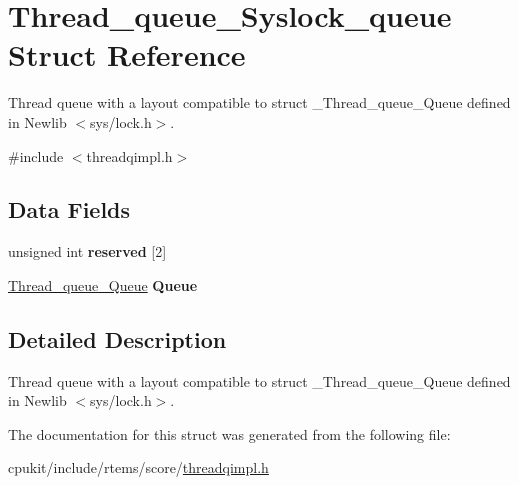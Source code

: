 \hypertarget{structThread__queue__Syslock__queue}{}\section{Thread\+\_\+queue\+\_\+\+Syslock\+\_\+queue Struct Reference}
\label{structThread__queue__Syslock__queue}


Thread queue with a layout compatible to struct \+\_\+\+Thread\+\_\+queue\+\_\+\+Queue defined in Newlib $<$sys/lock.\+h$>$.  




{\ttfamily \#include $<$threadqimpl.\+h$>$}

\subsection*{Data Fields}
\begin{DoxyCompactItemize}
\item 
\mbox{\label{structThread__queue__Syslock__queue_a6fdd31d3db9d339b54df45c196cbbd1a}} 
unsigned int {\bfseries reserved} \mbox{[}2\mbox{]}
\item 
\mbox{\label{structThread__queue__Syslock__queue_a625c96f5ca5739b2ef54bd1791a60e63}} 
\mbox{\hyperlink{structThread__queue__Queue}{Thread\+\_\+queue\+\_\+\+Queue}} {\bfseries Queue}
\end{DoxyCompactItemize}


\subsection{Detailed Description}
Thread queue with a layout compatible to struct \+\_\+\+Thread\+\_\+queue\+\_\+\+Queue defined in Newlib $<$sys/lock.\+h$>$. 

The documentation for this struct was generated from the following file\+:\begin{DoxyCompactItemize}
\item 
cpukit/include/rtems/score/\mbox{\hyperlink{threadqimpl_8h}{threadqimpl.\+h}}\end{DoxyCompactItemize}
